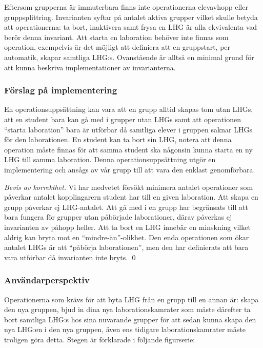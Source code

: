 Eftersom grupperna är immuterbara finns inte operationerna elevavhopp eller gruppsplittring. Invarianten syftar på antalet aktiva grupper vilket skulle betyda att operationerna: ta bort, inaktivera samt frysa en LHG är alla ekvivalenta vad berör denna invariant.  Att starta en laboration behöver inte finnas som operation, exempelvis är det möjligt att definiera att en gruppstart, per automatik, skapar samtliga LHG:s. Ovanstående är alltså en minimal grund för att kunna beskriva implementationer av invarianterna.

\subsubsection{Förslag på implementering}
En operationsuppsättning kan vara att en grupp alltid skapas tom utan LHGs, att en student bara kan gå med i grupper utan LHGs samt att operationen “starta laboration” bara är utförbar då samtliga elever i gruppen saknar LHGs för den laborationen. En student kan ta bort sin LHG, notera att denna operation måste finnas för att samma student ska någonsin kunna starta en ny LHG till samma laboration. Denna operationsuppsättning utgör en implementering och ansågs av vår grupp till att vara den enklast genomförbara.


\begin{proof}[Bevis av korrekthet]
  Vi har medvetet försökt minimera antalet operationer som påverkar antalet kopplingarern student har till en given laboration. Att skapa en grupp påverkar ej LHG-antalet. Att gå med i en grupp har begränsats till att bara fungera för grupper utan påbörjade laborationer, därav påverkas ej invarianten av påhopp heller. Att ta bort en LHG innebär en minskning vilket aldrig kan bryta mot en “mindre-än”-olikhet. Den enda operationen som ökar antalet LHGs är att “påbörja laborationen”, men den har definierats att bara vara utförbar då invarianten inte bryts. \qed
\end{proof}

\subsubsection{Användarperspektiv}
Operationerna som krävs för att byta LHG från en grupp till en annan är: skapa den nya gruppen, bjud in dina nya laborationskamrater som måste därefter ta bort samtliga LHG:s hos sina nuvarande grupper för att sedan kunna skapa den nya LHG:en i den nya gruppen, även ens tidigare laborationskamrater måste troligen göra detta. Stegen är förklarade i följande figurserie:

